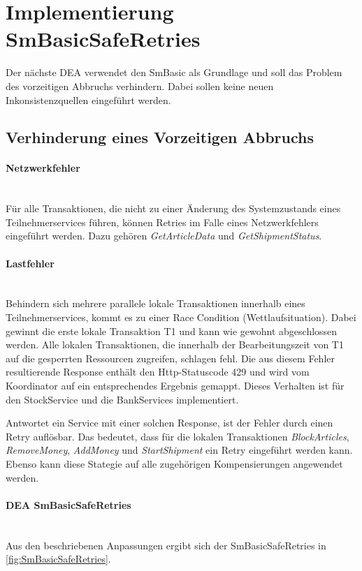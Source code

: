 \section{Implementierung SmBasicSafeRetries}

Der nächste DEA verwendet den SmBasic als Grundlage und soll das Problem des vorzeitigen Abbruchs verhindern. Dabei sollen keine neuen Inkonsistenzquellen eingeführt werden. 

\subsection{Verhinderung eines Vorzeitigen Abbruchs}

\paragraph*{Netzwerkfehler} \mbox{}\\
Für alle Transaktionen, die nicht zu einer Änderung des Systemzustands eines Teilnehmerservices führen, können Retries im Falle eines Netzwerkfehlers eingeführt werden. Dazu gehören \textit{GetArticleData} und \textit{GetShipmentStatus}. 

\paragraph*{Lastfehler} \mbox{}\\
Behindern sich mehrere parallele lokale Transaktionen innerhalb eines Teilnehmerservices, kommt es zu einer Race Condition (Wettlaufsituation). Dabei gewinnt die erste lokale Transaktion T1 und kann wie gewohnt abgeschlossen werden. Alle lokalen Transaktionen, die innerhalb der Bearbeitungszeit von T1 auf die gesperrten Ressourcen zugreifen, schlagen fehl. Die aus diesem Fehler resultierende Response enthält den Http-Statuscode 429 und wird vom Koordinator auf ein entsprechendes Ergebnis gemappt. Dieses Verhalten ist für den StockService und die BankServices implementiert. 

Antwortet ein Service mit einer solchen Response, ist der Fehler durch einen Retry auflösbar. Das bedeutet, dass für die lokalen Transaktionen \textit{BlockArticles}, \textit{RemoveMoney}, \textit{AddMoney} und \textit{StartShipment} ein Retry eingeführt werden kann. Ebenso kann diese Stategie auf alle zugehörigen Kompensierungen angewendet werden.

\paragraph*{DEA SmBasicSafeRetries} \mbox{}\\
Aus den beschriebenen Anpassungen ergibt sich der SmBasicSafeRetries in \cref{fig:SmBasicSafeRetries}. 

